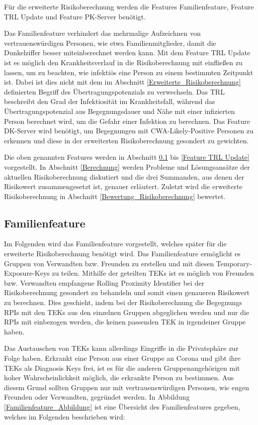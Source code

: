 \documentclass[conference,compsoc]{IEEEtran}
\begin{document}
Für die erweiterte Risikoberechnung werden die Features Familienfeature, Feature TRL Update und
Feature PK-Server benötigt.

Das Familienfeature verhindert das mehrmalige Aufzeichnen von vertrauenswürdigen Personen, wie etwa Familienmitglieder,
damit die Dunkelziffer besser miteinberechnet werden kann.
Mit dem Feature TRL Update ist es möglich den Krankheitsverlauf in die Risikoberechnung mit einfließen zu lassen, um zu beachten, wie infektiös eine Person zu einem bestimmten Zeitpunkt ist.
Dabei ist dies nicht mit dem im Abschnitt \ref{Erweiterte_Risikoberechnung} definierten Begriff des Übertragungspotenzials zu verwechseln.
Das TRL beschreibt den Grad der Infektiosität im Krankheitsfall, 
während das Übertragungspotenzial aus Begegnungsdauer und Nähe mit einer infizierten Person berechnet wird, um die Gefahr einer Infektion zu berechnen.  
Das Feature DK-Server wird benötigt, um Begegnungen mit CWA-Likely-Positive Personen zu erkennen und diese in der erweiterten Risikoberechnung gesondert zu gewichten.

Die oben genannten Features werden in Abschnitt \ref{Familienfeature} bis \ref{Feature TRL Update} vorgestellt.
In Abschnitt \ref{Berechnung} werden Probleme und Lösungsansätze der aktuellen Risikoberechnung diskutiert und die drei Summanden, aus denen der Risikowert zusammengesetzt ist, genauer erläutert.
Zuletzt wird die erweiterte Risikoberechnung in Abschnitt \ref{Bewertung_Risikoberechnung} bewertet.
\\
\subsection{Familienfeature}
\label{Familienfeature}

Im Folgenden wird das Familienfeature vorgestellt, welches später für die erweiterte Risikoberechnung benötigt wird.
Das Familienfeature ermöglicht es Gruppen von Verwandten bzw. Freunden zu erstellen und mit diesen Temporary-Exposure-Keys zu teilen.
Mithilfe der geteilten TEKs ist es möglich von Freunden bzw. Verwandten empfangene Rolling Proximity Identifier bei der Risikoberechnung gesondert zu behandeln und 
somit einen genaueren Risikowert zu berechnen.
Dies geschieht, indem bei der Risikoberechnung die Begegnungs RPIs mit den TEKs aus den einzelnen Gruppen abgeglichen werden und nur die RPIs mit einbezogen werden, 
die keinen passenden TEK in irgendeiner Gruppe haben.

Das Austauschen von TEKs kann allerdings Eingriffe in die Privatsphäre zur Folge haben.
Erkrankt eine Person aus einer Gruppe an Corona und gibt ihre TEKs als Diagnosis Keys frei, ist es für die anderen Gruppenangehörigen mit hoher Wahrscheinlichkeit möglich, die erkrankte Person zu bestimmen.
Aus diesem Grund sollten Gruppen nur mit vertrauenswürdigen Personen, wie engen Freunden oder Verwandten, gegründet werden.
In Abbildung \ref{Familienfeature_Abbildung} ist eine Übersicht des Familienfeatures gegeben, welches im Folgenden beschrieben wird:
\end{document}
